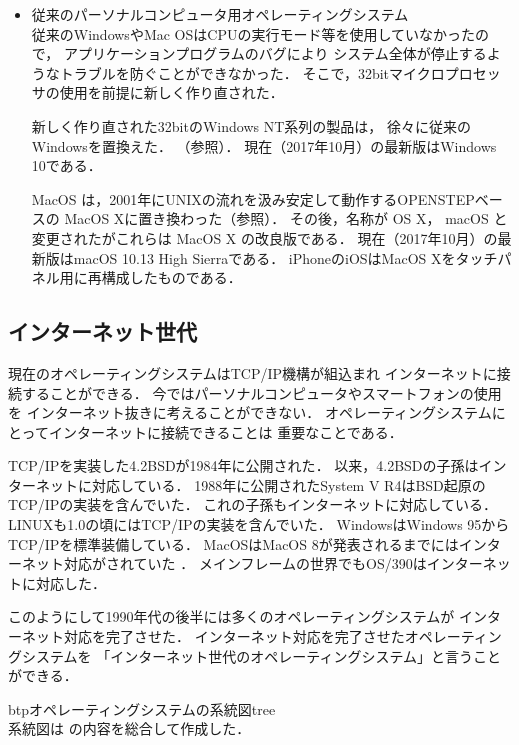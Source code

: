 \begin{enumerate}
\begin{itemize}
\item 従来のパーソナルコンピュータ用オペレーティングシステム \\
従来のWindowsやMac OSはCPUの実行モード等を使用していなかったので，
アプリケーションプログラムのバグにより
システム全体が停止するようなトラブルを防ぐことができなかった．
そこで，32bitマイクロプロセッサの使用を前提に新しく作り直された．

新しく作り直された32bitのWindows NT系列の製品は，
徐々に従来のWindowsを置換えた．
（参照）．
現在（2017年10月）の最新版はWindows 10である．

MacOS は，2001年にUNIXの流れを汲み安定して動作するOPENSTEPベースの
MacOS X\cite{macos}に置き換わった（参照）．
その後，名称が OS X， macOS と変更されたがこれらは MacOS X の改良版である．
現在（2017年10月）の最新版はmacOS 10.13 High Sierraである．
iPhoneのiOSはMacOS Xをタッチパネル用に再構成したものである\cite{ios}．
\end{itemize}
\end{enumerate}

\subsection{インターネット世代}
現在のオペレーティングシステムはTCP/IP機構が組込まれ
インターネットに接続することができる．
今ではパーソナルコンピュータやスマートフォンの使用を
インターネット抜きに考えることができない．
オペレーティングシステムにとってインターネットに接続できることは
重要なことである．

TCP/IPを実装した4.2BSDが1984年に公開された\cite{bsd}．
以来，4.2BSDの子孫はインターネットに対応している．
1988年に公開されたSystem V R4はBSD起原のTCP/IPの実装を含んでいた\cite{svr4}．
これの子孫もインターネットに対応している．
LINUXも1.0の頃にはTCP/IPの実装を含んでいた\cite{linux1}．
WindowsはWindows 95からTCP/IPを標準装備している\cite{windows}．
MacOSはMacOS 8が発表されるまでにはインターネット対応がされていた
\cite{classicmacos}．
メインフレームの世界でもOS/390はインターネットに対応した\cite{os390}．

このようにして1990年代の後半には多くのオペレーティングシステムが
インターネット対応を完了させた．
インターネット対応を完了させたオペレーティングシステムを
「インターネット世代のオペレーティングシステム」と言うことができる．

\begin{myfig}{btp}{オペレーティングシステムの系統図}{tree}
 \\
{\small
系統図は\cite{os360,
mvs,
os390,
zos,
unix,
solaris,
aix,
mach,
bsd,
bsdd,
386bsd,
freebsd,
freenas,
nextstep,
classicmacos,
dynabook,
macos,
ios,
linux,
android,
msdos,
windows}
の内容を総合して作成した．}
\end{myfig}
